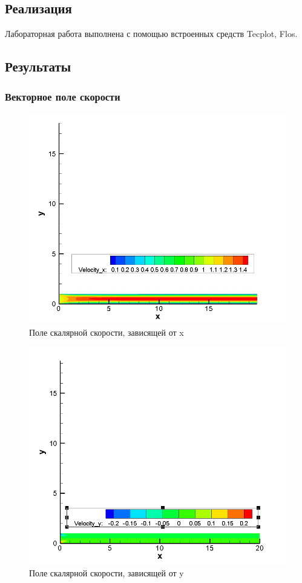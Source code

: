 \documentclass[12pt, a4paper]{article}
\begin{document}
\subsection{Реализация}
Лабораторная работа выполнена с помощью встроенных средств Tecplot, Flos.

\subsection{Результаты}

\subsubsection{Векторное поле скорости}
\begin{figure}[H]
    \centering
    \includegraphics[scale = 0.6]{figure/RE135_Velocity_x.jpg}
    \caption{Поле скалярной скорости, зависящей от x}
    \label{pic1}
\end{figure}

\begin{figure}[H]
    \centering
    \includegraphics[scale = 0.6]{figure/RE135_Velocity_y.png}
    \caption{Поле скалярной скорости, зависящей от y}
    \label{pic2}
\end{figure}
\end{document}

